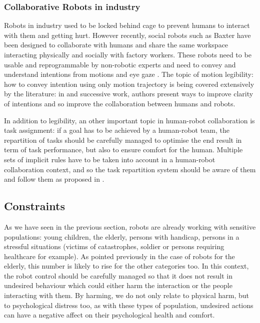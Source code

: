 \subsubsection{Collaborative Robots in industry}
	Robots in industry used to be locked behind cage to prevent humans to interact with them and getting hurt. However recently, social robots such as Baxter \citep{guizzo2012rethink} have been designed to collaborate with humans and share the same workspace interacting physically and socially with factory workers. These robots need to be usable and reprogrammable by non-robotic experts and need to convey and understand intentions from motions and eye gaze \citep{bauer2008human}. The topic of motion legibility: how to convey intention using only motion trajectory is being covered extensively by the literature: in \citet{dragan2013legibility} and successive work, authors present ways to improve clarity of intentions and so improve the collaboration between humans and robots.

    In addition to legibility, an other important topic in human-robot collaboration is task assignment: if a goal has to be achieved by a human-robot team, the repartition of tasks should be carefully managed to  optimise the end result in term of task performance, but also to ensure comfort for the human. Multiple sets of implicit rules have to be taken into account in a human-robot collaboration context, and so the task repartition system should be aware of them and follow them as proposed in \cite{montreuil2007planning}.
	

\subsection{Constraints} \label{ssec:back_const}

    As we have seen in the previous section, robots are already working with
    sensitive populations: young children, the elderly, persons with handicap,
    persons in a stressful situations (victims of catastrophes, soldier or
    persons requiring healthcare for example). As pointed previously in the case
    of robots for the elderly, this number is likely to rise for the other
    categories too. In this context, the robot control should be carefully
    managed so that it does not result in undesired behaviour which could either
    harm the interaction or the people interacting with them. By harming, we do
    not only relate to physical harm, but to psychological distress too, as with
    these types of population, undesired actions can have a negative affect on
    their psychological health and comfort.


